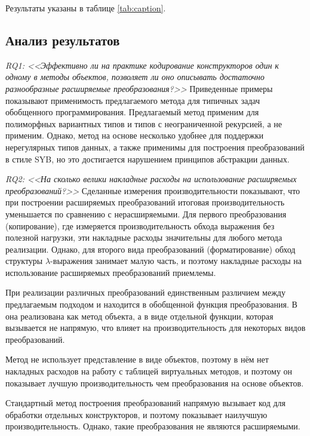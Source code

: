 Результаты указаны в таблице \ref{tab:caption}.

\subsection{Анализ результатов}
\emph{RQ1: <<Эффективно ли  на практике кодирование конструкторов один к одному в методы объектов, позволяет ли оно описывать достаточно разнообразные расширяемые преобразования?>>} Приведенные примеры показывают применимость  предлагаемого метода для типичных задач обобщенного программирования. Предлагаемый метод применим для полиморфных вариантных типов \OCaml{} и типов с неограниченной рекурсией, а \Visitors{} не применим. Однако, метод на основе \Visitors{} несколько удобнее для поддержки нерегулярных типов данных, а также \Visitors{} применимы для построения преобразований в стиле SYB\cite{SYB}, но это достигается нарушением принципов абстракции данных.

\emph{RQ2: <<На сколько велики накладные расходы на использование расширяемых преобразований?>>} Сделанные измерения производительности показывают, что при построении расширяемых преобразований итоговая производительность уменьшается по сравнению с нерасширяемыми. Для первого  преобразования (копирование), где измеряется производительность обхода выражения без полезной нагрузки, эти накладные расходы значительны для любого метода реализации. Однако, для второго вида преобразований (форматирование) обход структуры $\lambda$-выражения занимает малую часть, и поэтому накладные расходы на использование расширяемых преобразований приемлемы. 

При реализации различных преобразований единственным различием между предлагаемым подходом и \Visitors{} находится в обобщенной функция преобразования. В \Visitors{} она реализована как метод объекта, а в \GT{}  виде отдельной функции, которая вызывается не напрямую, что влияет на производительность для некоторых видов преобразований.

Метод  не использует представление в виде объектов, поэтому в нём нет накладных расходов на работу с таблицей виртуальных методов, и поэтому он показывает лучшую производительность чем преобразования на основе объектов.

Стандартный метод построения преобразований напрямую вызывает код для обработки отдельных конструкторов, и поэтому показывает наилучшую производительность. Однако, такие преобразования не являются расширяемыми.




